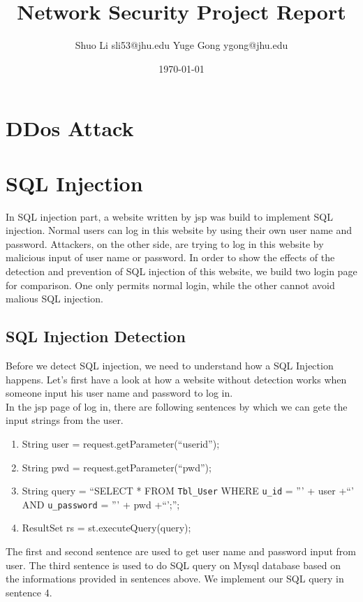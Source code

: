 \documentclass[12pt]{article}
\begin{document}
\title{Network Security Project Report}
\author{Shuo Li sli53@jhu.edu Yuge Gong ygong@jhu.edu}
\date{\today}
\maketitle
\section{DDos Attack}

\newpage
\section{SQL Injection}
In SQL injection part, a website written by jsp was build to implement SQL injection. Normal users can log in this website by using their own user name and password. Attackers, on the other side, are trying to log in this website by malicious input of user name or password. In order to show the effects of the detection and prevention of SQL injection of this website, we build two login page for comparison. One only permits normal login, while the other cannot avoid malious SQL injection.\\

\subsection{SQL Injection Detection}
Before we detect SQL injection, we need to understand how a SQL Injection happens. Let's first have a look at how a website without detection works when someone input his user name and password to log in.\\
In the jsp page of log in, there are following sentences by which we can gete the input strings from the user.
\begin{enumerate}
\item String user = request.getParameter(``userid''); 
\item String pwd = request.getParameter(``pwd'');
\item String query = ``SELECT * FROM \verb"Tbl_User" WHERE \verb"u_id" = ''' + user +``' AND \verb"u_password" = ''' + pwd +``';'';
\item ResultSet rs = st.executeQuery(query);
\end{enumerate} 
The first and second sentence are used to get user name and password input from user. The third sentence is used to do SQL query on Mysql database based on the informations provided in sentences above. We implement our SQL query in sentence 4.\\
\end{document}
